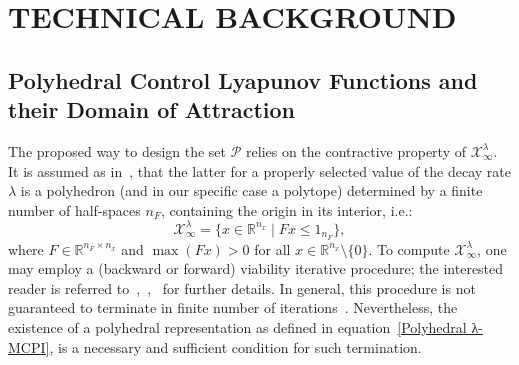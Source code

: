 \documentclass[letterpaper, 10 pt, conference]{ieeeconf}  %
\begin{document}
\section{TECHNICAL BACKGROUND}

\subsection{Polyhedral Control Lyapunov Functions and their Domain of Attraction}

The proposed way to design the set $\mathcal{P}$ relies on the contractive property of $\mathcal{X}^{\lambda}_{\infty}$. It is assumed as in~\cite{Grammatico2012PCLF}, that the latter for a properly selected value of the decay rate $\lambda$ is a polyhedron (and in our specific case a polytope) determined by a finite number of half-spaces $n_F$, containing the origin in its interior, i.e.:
\begin{equation}\label{Polyhedral λ-MCPI}
\mathcal{X}^{\lambda}_{\infty} = \{x \in \mathbb{R}^{n_x} \mid Fx \leq 1_{n_F}\},
\end{equation}
where $F \in \mathbb{R}^{n_F \times n_x}$ and $\max(Fx) > 0$ for all $x \in \mathbb{R}^{n_x} \setminus \{0\}$. 
To compute $\mathcal{X}^{\lambda}_{\infty}$, one may employ a (backward or forward) viability iterative procedure; the interested reader is referred to~\cite{Blanchini1994UltimateBounded},~\cite{Blanchini2008SetTheoreticMethods},~\cite{Miani2005MAXISG} for further details. 
In general, this procedure is not guaranteed to terminate in finite number of iterations~\cite{Kerrigan2000InvariantSetsinMPC}. Nevertheless, the existence of a polyhedral representation as defined in equation~\eqref{Polyhedral λ-MCPI}, is a necessary and sufficient condition for such termination.
\end{document}
